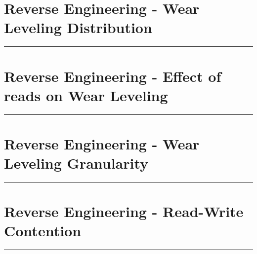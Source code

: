 \documentclass[letterpaper,twocolumn,10pt]{article}
\begin{document}
\begin{minipage}{\linewidth}
\section*{Reverse Engineering - Wear Leveling Distribution}
\begin{figure}[H]
{}
\label{fig:wear_leveling_timing}
\end{figure}
\hrule
\end{minipage}


\begin{minipage}{\linewidth}
\section*{Reverse Engineering - Effect of reads on Wear Leveling}
\begin{figure}[H]
\centering

\label{fig:wear-leveling-readwrite}
\end{figure}
\hrule
\end{minipage}


\begin{minipage}{\linewidth}
\section*{Reverse Engineering - Wear Leveling Granularity}
\begin{figure}[H]
\centering
\begin{subfigure}[b]{0.49\hsize}

\end{subfigure}
\begin{subfigure}[b]{0.49\hsize}

\end{subfigure}
\label{fig:wear-leveling-granularity}
\end{figure}
\hrule
\end{minipage}


\begin{minipage}{\linewidth}
\section*{Reverse Engineering - Read-Write Contention}
\begin{figure}[H]
\centering

\label{fig:read_write_contention}
\end{figure}
\hrule
\end{minipage}
\end{document}
